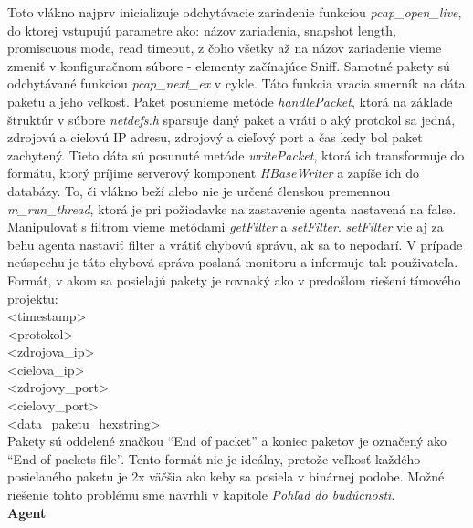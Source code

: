 \documentclass[a4paper,12pt]{article}
\begin{document}
Toto vlákno najprv inicializuje odchytávacie zariadenie funkciou \textit{pcap\_open\_live}, do ktorej vstupujú parametre ako: názov zariadenia, snapshot length, promiscuous mode, read timeout, z čoho všetky až na názov zariadenie vieme zmeniť v konfiguračnom súbore - elementy začínajúce Sniff. Samotné pakety sú odchytávané funkciou \textit{pcap\_next\_ex} v cykle. Táto funkcia vracia smerník na dáta paketu a jeho veľkosť. Paket posunieme metóde \textit{handlePacket}, ktorá na základe štruktúr v súbore \textit{netdefs.h} sparsuje daný paket a vráti o aký protokol sa jedná, zdrojovú a cieľovú IP adresu, zdrojový a cieľový port a čas kedy bol paket zachytený. Tieto dáta sú posunuté metóde \textit{writePacket}, ktorá ich transformuje do formátu, ktorý príjime serverový komponent \textit{HBaseWriter} a zapíše ich do databázy. To, či vlákno beží alebo nie je určené členskou premennou \textit{m\_run\_thread}, ktorá je pri požiadavke na zastavenie agenta nastavená na false. \\

Manipulovať s filtrom vieme metódami \textit{getFilter} a \textit{setFilter}. \textit{setFilter} vie aj za behu agenta nastaviť filter a vrátiť chybovú správu, ak sa to nepodarí. V prípade neúspechu je táto chybová správa poslaná monitoru a informuje tak použivateľa. \\

Formát, v akom sa posielajú pakety je rovnaký ako v predošlom riešení tímového projektu: \\

\noindent <timestamp> \\
<protokol> \\
<zdrojova\_ip> \\
<cielova\_ip> \\
<zdrojovy\_port> \\
<cielovy\_port> \\
<data\_paketu\_hexstring> \\

Pakety sú oddelené značkou “End of packet” a koniec paketov je označený ako “End of packets file”. Tento formát nie je ideálny, pretože veľkosť každého posielaného paketu je 2x väčšia ako keby sa posiela v binárnej podobe. Možné riešenie tohto problému sme navrhli v kapitole \textit{Pohľad do budúcnosti}. \\


\textbf{Agent} \\
\end{document}
